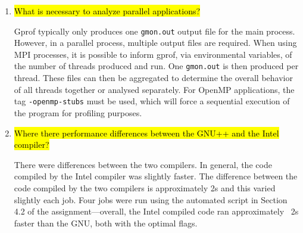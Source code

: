 \documentclass{article}
\begin{document}
\begin{enumerate}
	\item \hl{What is necessary to analyze parallel applications?}

	Gprof typically only produces one \verb!gmon.out! output file for the main process. However, in a parallel process, multiple output files are required. When using MPI processes, it is possible to inform gprof, via environmental variables, of the number of threads produced and run. One \verb!gmon.out! is then produced per thread. These files can then be aggregated to determine the overall behavior of all threads together or analysed separately. For OpenMP applications, the tag \verb!-openmp-stubs! must be used, which will force a sequential execution of the program for profiling purposes.

	\item \hl{Where there performance differences between the GNU++ and the Intel compiler?}

	There were differences between the two compilers. In general, the code compiled by the Intel compiler was slightly faster. The difference between the code compiled by the two compilers is approximately 2s and this varied slightly each job. Four jobs were run using the automated script in Section 4.2 of the assignment---overall, the Intel compiled code ran approximately ~2s faster than the GNU, both with the optimal flags.
\end{enumerate}
\end{document}
